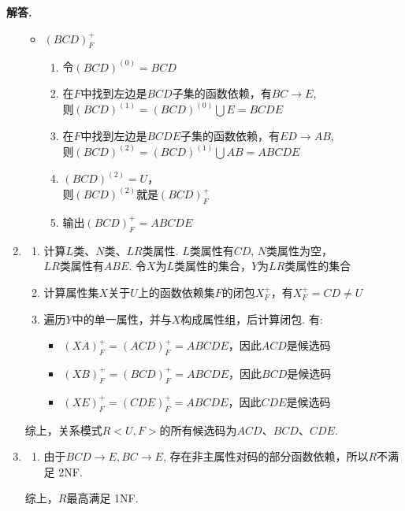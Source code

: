 \documentclass[12pt, oneside]{ctexart}
\numberwithin{figure}{section}
\numberwithin{table}{section}
\newenvironment{solution}{\par\noindent\textbf{解答. }}{\par}
\begin{document}
\begin{solution}
\begin{enumerate}[(1)]
\begin{itemize}
                \newpage
                \item $(BCD)_F^+$
                \begin{enumerate}[$1^\circ$]
                    \item 令$(BCD)^{(0)} = BCD$
                    \item 在$F$中找到左边是$BCD$子集的函数依赖，有$BC \rightarrow E$, \\
                    则$(BCD)^{(1)} = (BCD)^{(0)}\bigcup E = BCDE$
                    \item 在$F$中找到左边是$BCDE$子集的函数依赖，有$ED \rightarrow AB$, \\
                    则$(BCD)^{(2)} = (BCD)^{(1)}\bigcup AB = ABCDE$
                    \item $(BCD)^{(2)} = U$，\\
                    则$(BCD)^{(2)}$就是$(BCD)_F^+$
                    \item 输出$(BCD)_F^+ = ABCDE$
                \end{enumerate}
            \end{itemize}
        \item 
            \begin{enumerate}[$1^\circ$]
                \item 计算$L$类、$N$类、$LR$类属性. $L$类属性有$CD$, $N$类属性为空，\\
                $LR$类属性有$ABE$. 令$X$为$L$类属性的集合，$Y$为$LR$类属性的集合
                \item 计算属性集$X$关于$U$上的函数依赖集$F$的闭包$X_F^+$，有$X_F^+ = CD \not= U$
                \item 遍历$Y$中的单一属性，并与$X$构成属性组，后计算闭包. 有:
                    \begin{itemize}
                        \item $(XA)_F^+ = (ACD)_F^+ = ABCDE$，因此$ACD$是候选码
                        \item $(XB)_F^+ = (BCD)_F^+ = ABCDE$，因此$BCD$是候选码
                        \item $(XE)_F^+ = (CDE)_F^+ = ABCDE$，因此$CDE$是候选码
                    \end{itemize}
            \end{enumerate}
            综上，关系模式$R<U, F>$的所有候选码为$ACD$、$BCD$、$CDE$.
        \item 
            \begin{enumerate}[$1^\circ$]
                \item 由于$BCD\rightarrow E, BC\rightarrow E$, 存在非主属性对码的部分函数依赖，所以$R$不满足 2NF.
            \end{enumerate}

            综上，$R$最高满足 1NF.
        \end{enumerate}
\end{solution}
\end{document}
